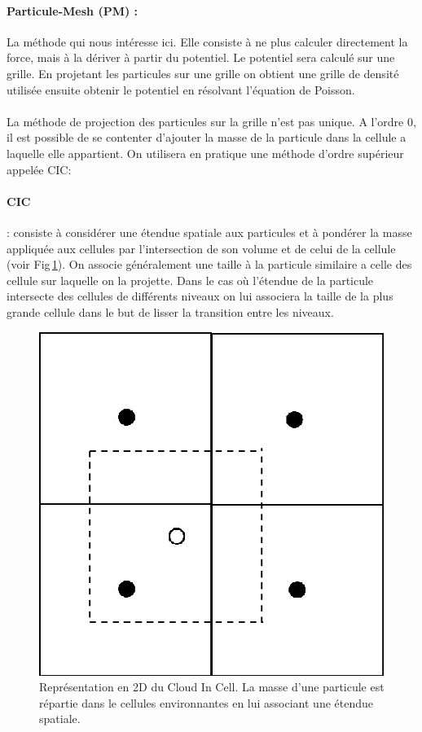 \paragraph{Particule-Mesh (PM) : } La méthode qui nous intéresse ici.
Elle consiste à ne plus calculer directement la force, mais à la dériver à partir du potentiel.
Le potentiel sera calculé sur une grille.
En projetant les particules sur une grille on obtient une grille de densité utilisée ensuite obtenir le potentiel en résolvant l'équation de Poisson.

\paragraph{}
La méthode de projection des particules sur la grille n'est pas unique.
A l'ordre $0$, il est possible de se contenter d'ajouter la masse de la particule dans la cellule a laquelle elle appartient.
On utilisera en pratique une méthode d'ordre supérieur appelée \ac{CIC}:

\paragraph{CIC} : consiste à considérer une étendue spatiale aux particules et à pondérer la masse appliquée aux cellules par l'intersection de son volume et de celui de la cellule (voir Fig\,\ref{fig:CIC}).
On associe généralement une taille à la particule similaire a celle des cellule sur laquelle on la projette.
Dans le cas où l’étendue de la particule intersecte des cellules de différents niveaux on lui associera la taille de la plus grande cellule dans le but de lisser la transition entre les niveaux.

\begin{figure}
		\centering
        \includegraphics[width=.5\linewidth]{img/02/CIC.jpg} 
        \caption[CIC]{Représentation en 2D du Cloud In Cell. 
        La masse d'une particule est répartie dans le cellules environnantes en lui associant une étendue spatiale.
 		\label{fig:CIC}}
\end{figure}


